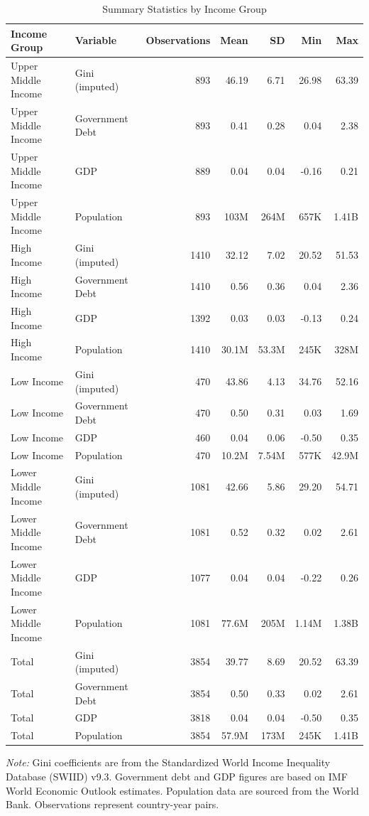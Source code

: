 \documentclass[12pt, titlepage]{article}
\numberwithin{equation}{section}
\begin{document}
	\begin{table}[!h]
		\centering
		\begin{threeparttable}
			\caption{Summary Statistics by Income Group}
			\label{table:table2}
			\fontsize{10}{12}\selectfont
			\begin{tabular}[t]{llrrrrr}
				\toprule
				Income Group & Variable & Observations & Mean & SD & Min & Max \\
				\midrule
				Upper Middle Income & Gini (imputed) & 893 & 46.19 & 6.71 & 26.98 & 63.39 \\
				Upper Middle Income & Government Debt & 893 & 0.41 & 0.28 & 0.04 & 2.38 \\
				Upper Middle Income & GDP & 889 & 0.04 & 0.04 & -0.16 & 0.21 \\
				Upper Middle Income & Population & 893 & 103M & 264M & 657K & 1.41B \\
				High Income & Gini (imputed) & 1410 & 32.12 & 7.02 & 20.52 & 51.53 \\
				High Income & Government Debt & 1410 & 0.56 & 0.36 & 0.04 & 2.36 \\
				High Income & GDP & 1392 & 0.03 & 0.03 & -0.13 & 0.24 \\
				High Income & Population & 1410 & 30.1M & 53.3M & 245K & 328M \\
				Low Income & Gini (imputed) & 470 & 43.86 & 4.13 & 34.76 & 52.16 \\
				Low Income & Government Debt & 470 & 0.50 & 0.31 & 0.03 & 1.69 \\
				Low Income & GDP & 460 & 0.04 & 0.06 & -0.50 & 0.35 \\
				Low Income & Population & 470 & 10.2M & 7.54M & 577K & 42.9M \\
				Lower Middle Income & Gini (imputed) & 1081 & 42.66 & 5.86 & 29.20 & 54.71 \\
				Lower Middle Income & Government Debt & 1081 & 0.52 & 0.32 & 0.02 & 2.61 \\
				Lower Middle Income & GDP & 1077 & 0.04 & 0.04 & -0.22 & 0.26 \\
				Lower Middle Income & Population & 1081 & 77.6M & 205M & 1.14M & 1.38B \\
				Total & Gini (imputed) & 3854 & 39.77 & 8.69 & 20.52 & 63.39 \\
				Total & Government Debt & 3854 & 0.50 & 0.33 & 0.02 & 2.61 \\
				Total & GDP & 3818 & 0.04 & 0.04 & -0.50 & 0.35 \\
				Total & Population & 3854 & 57.9M & 173M & 245K & 1.41B \\
				\bottomrule
			\end{tabular}
			\begin{tablenotes}
				\footnotesize
				\item \textit{Note:} Gini coefficients are from the Standardized World Income Inequality Database (SWIID) v9.3. Government debt and GDP figures are based on IMF World Economic Outlook estimates. Population data are sourced from the World Bank. Observations represent country-year pairs.
			\end{tablenotes}
		\end{threeparttable}
	\end{table}
\end{document}
